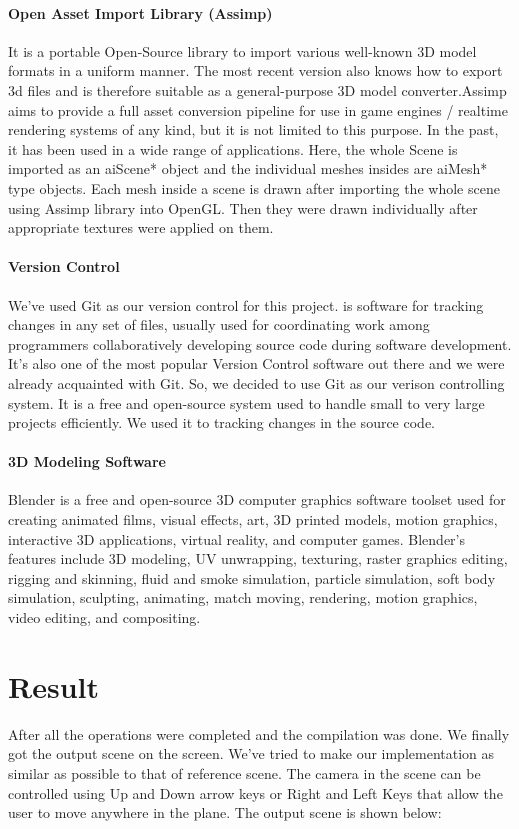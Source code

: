 \documentclass{report}
\begin{document}
    \paragraph{Open Asset Import Library (Assimp)}
    It is a portable Open-Source library to import various well-known 3D model formats in a uniform 
    manner. The most recent version also knows how to export 3d files and is therefore suitable as a 
    general-purpose 3D model converter.Assimp aims to provide a full asset conversion pipeline for 
    use in game engines / realtime rendering systems of any kind, but it is not limited to this purpose. 
    In the past, it has been used in a wide range of applications. Here, the whole Scene is imported as 
    an aiScene* object and the individual meshes insides are aiMesh* type objects. Each mesh inside a scene 
    is drawn after importing the whole scene using Assimp library into OpenGL. Then they were drawn individually 
    after appropriate textures were applied on them.

    \paragraph{Version Control}
    We've used Git as our version control for this project. is software for tracking changes in any set of files, 
    usually used for coordinating work among programmers collaboratively developing source code during 
    software development. It's also one of the most popular Version Control software out there and we were 
    already acquainted with Git. So, we decided to use Git as our verison controlling system. It is a free and 
    open-source system used to handle small to very large projects efficiently. We used it to tracking changes 
    in the source code.

    \paragraph{3D Modeling Software}
    Blender is a free and open-source 3D computer graphics software toolset used for creating animated films, 
    visual effects, art, 3D printed models, motion graphics, interactive 3D applications, virtual reality, 
    and computer games. Blender's features include 3D modeling, UV unwrapping, texturing, raster graphics editing, 
    rigging and skinning, fluid and smoke simulation, particle simulation, soft body simulation, sculpting, 
    animating, match moving, rendering, motion graphics, video editing, and compositing. 
\section{Result}
    After all the operations were completed and the compilation was done. We finally got the output scene on 
    the screen. We've tried to make our implementation as similar as possible to that of reference scene. 
    The camera in the scene can be controlled using Up and Down arrow keys or Right and Left Keys that allow the user 
    to move anywhere in the plane. The output scene is shown below:
\end{document}
